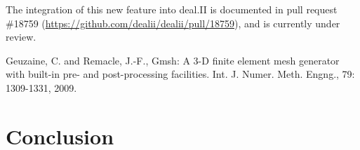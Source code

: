 \documentclass[a4paper,12pt]{article}
\begin{document}
\noindent The integration of this new feature into deal.II is documented in
pull request \#18759 (\url{https://github.com/dealii/dealii/pull/18759}), and is
currently under review.

\begin{thebibliography}{10}
     Geuzaine, C. and Remacle, J.-F., Gmsh: A 3-D finite element mesh generator with built-in pre- and post-processing facilities. Int. J. Numer. Meth. Engng., 79: 1309-1331, 2009.
\end{thebibliography}


\newpage

\section{{Conclusion}} \label{sec:conclusion}

\lipsum[20]

\label{MyLastPage}
\end{document}

